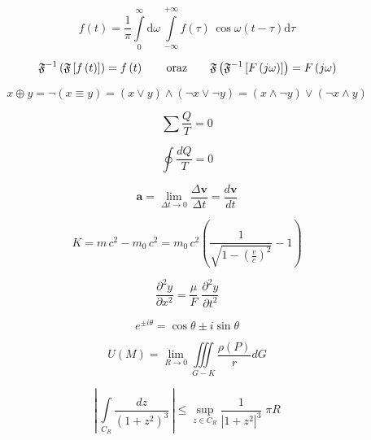 \begin{equation}
    f(t) = \frac{1}{\pi} \int\limits_0^\infty \mathrm{d} \omega \,\int\limits_{-\infty}^{+\infty} f(\tau)\, \cos \omega (t-\tau)  \mathrm{d}\tau
\end{equation}

\[
\mathfrak{F}^{-1}\left(\mathfrak{F} \left[ f\left(t \right ) \right ] \right ) = f \left(t \right )
\qquad \textup{oraz} \qquad
\mathfrak{F}\left(\mathfrak{F}^{-1} \left[ F\left(j\omega \right ) \right ] \right ) = F \left(j\omega \right )
\]

\begin{equation*}
    x \oplus y = \neg (x \equiv y) = (x \vee y) \wedge (\neg x \vee \neg y) = (x \wedge \neg y) \vee (\neg x \wedge y)
\end{equation*}

\begin{equation*}
    \sum \frac{Q}{T} = 0
\end{equation*}

\begin{equation}
    \oint \frac{dQ}{T} = 0
\end{equation}

\begin{equation}
    \pmb{a} = \lim\limits_{\Delta t \to 0} \frac{\Delta \pmb{v}}{\Delta t} = \frac{d\pmb{v}}{dt}
\end{equation}

\begin{equation}
K = m\,c^2 - m_0\,c^2
 = m_0\,c^2 \left(
  \frac{1}{ \sqrt{1 - \left( \frac{v}{c} \right)^2 } } -1
 \right)
\end{equation}

\begin{equation}
    \frac{\partial^2 y}{\partial x^2} = \frac{\mu}{F} \; \frac{\partial^2 y}{\partial t^2}
\end{equation}

\begin{equation}
    e^{\pm i\theta} = \cos \theta \pm i \sin\theta
\end{equation}

\begin{equation}
    U(M) = \lim\limits_{R\to 0} \iiint\limits_{G-K}\frac{\rho(P)}{r}dG
\end{equation}

\begin{equation*}
    \left| \, \int\limits_{C_R} \frac{dz}{\left( 1+z^2 \right )^3} \, \right| \leqslant \sup\limits_{z \in C_R} \frac{1}{\left| 1+z^2 \right|^3} \; \pi R
\end{equation*}

